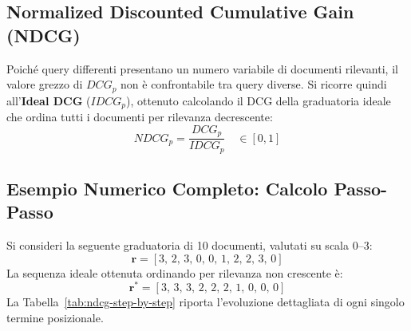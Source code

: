 \subsection{Normalized Discounted Cumulative Gain (NDCG)}
Poiché query differenti presentano un numero variabile di documenti rilevanti, il valore grezzo di $DCG_p$ non è confrontabile tra query diverse. Si ricorre quindi all'\textbf{Ideal DCG} ($IDCG_p$), ottenuto calcolando il DCG della graduatoria ideale che ordina tutti i documenti per rilevanza decrescente:
\begin{equation}
NDCG_p = \frac{DCG_p}{IDCG_p} \quad \in [0, 1]
\end{equation}

\subsection{Esempio Numerico Completo: Calcolo Passo-Passo}
Si consideri la seguente graduatoria di 10 documenti, valutati su scala $0$--$3$:
\[
\mathbf{r} = [3, \, 2, \, 3, \, 0, \, 0, \, 1, \, 2, \, 2, \, 3, \, 0]
\]
La sequenza ideale ottenuta ordinando per rilevanza non crescente è:
\[
\mathbf{r}^* = [3, \, 3, \, 3, \, 2, \, 2, \, 2, \, 1, \, 0, \, 0, \, 0]
\]
La Tabella~\ref{tab:ndcg-step-by-step} riporta l'evoluzione dettagliata di ogni singolo termine posizionale.

\begin{table}[H]
\centering
{}
\caption{Tracciamento dettagliato del calcolo di $DCG@i$, $IDCG@i$ e $NDCG@i$ per $i=1,\dots,10$.}
\label{tab:ndcg-step-by-step}
\end{table}

